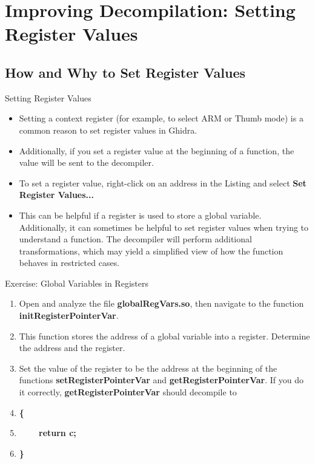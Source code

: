 \documentclass{beamer}
\begin{document}
\section{Improving Decompilation: Setting Register Values}

\subsection{How and Why to Set Register Values}
\begin{frame}
\begin{block}{Setting Register Values}
\begin{itemize}
\item Setting a context register (for example, to select ARM or Thumb mode) is a common reason to set register values in Ghidra.
\item Additionally, if you set a register value at the beginning of a function, the value will be sent to the decompiler.
\item To set a register value, right-click on an address in the Listing and select \textbf{Set Register Values...}
\item This can be helpful if a register is used to store a global variable.  Additionally, it can sometimes be helpful to set register values when trying to 
understand a function.  The decompiler will perform additional transformations, which may yield a simplified view of how the function behaves in restricted cases.
\end{itemize}
\end{block}
\end{frame}

\begin{frame}
\begin{block}{Exercise: Global Variables in Registers}
\begin{enumerate}
\item Open and analyze the file \textbf{globalRegVars.so}, then navigate to the function \textbf{initRegisterPointerVar}.  
\item This function stores the address of a global variable into a register.  Determine the address and the register.
\item Set the value of the register to be the address at the beginning of the functions \textbf{setRegisterPointerVar} and \textbf{getRegisterPointerVar}. If you do it correctly,
\textbf{getRegisterPointerVar} should decompile to 
\item[]\textbf{\{}
\item[]\textbf{~~~~return c;}
\item[]\textbf{\}}
\end{enumerate}
\end{block}
\end{frame}
\end{document}
